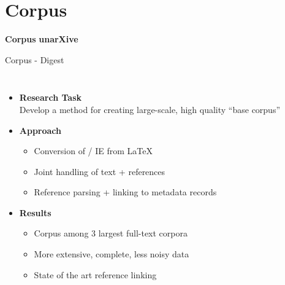 \documentclass[en,16:9,smallfoot]{sdqbeamer}
\begin{document}
\section{Corpus}

   \begin{frame}[plain]
        \vspace{0.7cm}
        \begin{infobox-map}
        \centering
        \begin{Huge}
         {\textbf{Corpus}}
         {\textbf{\hphantom{C}unarXive\hphantom{C}}}
        \end{Huge}
        \end{infobox-map}
   \end{frame}

   \begin{frame}{Corpus - Digest}
   \begin{columns}
        \begin{itemize}
            \item \textbf{Research Task}\\Develop a method for creating large-scale, high quality ``base corpus''
            \item \textbf{Approach}
            \begin{itemize}
                \item Conversion of / IE from \LaTeX
                \item Joint handling of text + references
                \item Reference parsing + linking to metadata records
            \end{itemize}
            \item \textbf{Results}
            \begin{itemize}
                \item Corpus among 3 largest full-text corpora
                \item More extensive, complete, less noisy data
                \item State of the art reference linking
            \end{itemize}
        \end{itemize}

\end{columns}
\end{frame}
\end{document}
